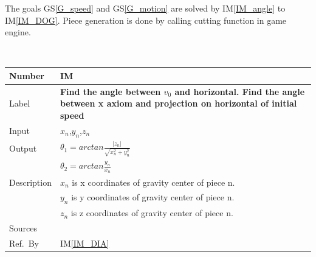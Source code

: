 \documentclass[12pt]{article}
\newcommand{\colAwidth}{0.13\textwidth}
\newcommand{\colBwidth}{0.82\textwidth}
\newcommand{\gsref}[1]{GS\ref{#1}}
\newcounter{instnum} %
\newcommand{\iref}[1]{IM\ref{#1}}
\begin{document}
	The goals \gsref{G_speed} and \gsref{G_motion} are solved by \iref{IM_angle} to \iref{IM_DOG}.
	Piece generation is done by calling cutting function in game engine.   
	
	~\newline
	
	
	\noindent
	\begin{minipage}{\textwidth}
		\renewcommand*{\arraystretch}{1.5}
		\begin{tabular}{| p{\colAwidth} | p{\colBwidth}|}
			\hline
			\rowcolor[gray]{0.9}
			Number& IM{instnum}\theinstnum \label{IM_angle}\\
			\hline
			Label& \bf Find the angle between $v_{0}$ and horizontal. Find the angle between x axiom and projection on horizontal of initial speed \\
			\hline
			Input&$x_{n}$,$y_{n}$,$z_{n}$\\
			\hline
			Output&$\theta_{1}=arctan \frac{|z_{n}|}{\sqrt{x_{n}^2+y_{n}^2}}$\\
			&$\theta_{2}=arctan \frac{y_{n}}{x_{n}}$\\
			\hline
			Description&$x_{n}$ is x coordinates of gravity center of piece n.\\
			&$y_{n}$ is y coordinates of gravity center of piece n.\\
			&$z_{n}$ is z coordinates of gravity center of piece n.\\
			\hline
			Sources&~\ \ \\
			\hline
			Ref.\ By & \iref{IM_DIA}\\
			\hline
		\end{tabular}
	\end{minipage}\\
	
	~\newline
	
\end{document}
